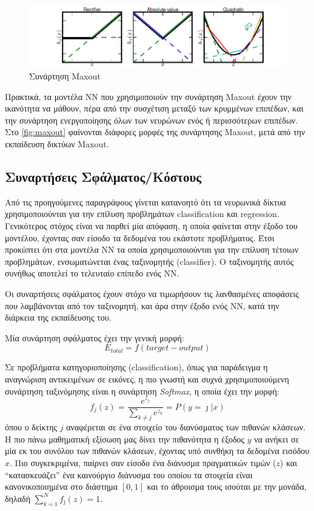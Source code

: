 \begin{figure}[!ht]
  \centering
  \includegraphics[width=1\textwidth]{./images/chapter3/maxout.png}
  \caption[Συνάρτηση Maxout]{Συνάρτηση Maxout}
  \label{fig:maxout}
\end{figure}

Πρακτικά, τα μοντέλα ΝΝ που χρησιμοποιούν την συνάρτηση Maxout έχουν την
ικανότητα να μάθουν, πέρα από την συσχέτιση μεταξύ των κρυμμένων επιπέδων,
και την συνάρτηση ενεργοποίησης όλων των νευρώνων ενός ή περισσότερων
επιπέδων.
Στο \autoref{fig:maxout} φαίνονται διάφορες μορφές της συνάρτησης Maxout,
μετά από την εκπαίδευση δικτύων Maxout.

\subsection{Συναρτήσεις Σφάλματος/Κόστους}

Από τις προηγούμενες παραγράφους γίνεται κατανοητό ότι τα νευρωνικά δίκτυα χρησιμοποιούνται για την επίλυση
προβλημάτων classification και regression. Γενικότερος στόχος είναι να παρθεί
μία απόφαση, η οποία φαίνεται στην έξοδο του μοντέλου, έχοντας σαν είσοδο
τα δεδομένα του εκάστοτε προβλήματος.
Έτσι προκύπτει ότι στα μοντέλα ΝΝ τα οποία χρησιμοποιούνται για την επίλυση
τέτοιων προβλημάτων, ενσωματώνεται ένας ταξινομητής (classifier). Ο ταξινομητής
αυτός συνήθως αποτελεί το τελευταίο επίπεδο ενός ΝΝ.

Οι συναρτήσεις σφάλματος έχουν στόχο να τιμωρήσουν τις λανθασμένες αποφάσεις
που λαμβάνονται από τον ταξινομητή, και άρα στην έξοδο ενός ΝΝ,
κατά την διάρκεια της εκπαίδευσης του.

Μία συνάρτηση σφάλματος έχει την γενική μορφή:
\[
  E_{total} = f(target - output)
\]

Σε προβλήματα κατηγοριοποίησης (classification), όπως για παράδειγμα
η αναγνώριση αντικειμένων σε εικόνες, η πιο γνωστή και συχνά χρησιμοποιούμενη συνάρτηση ταξινόμησης
είναι η συνάρτηση \emph{Softmax}, η οποία έχει την μορφή:
\begin{equation*}
  f_{j}(z) = \frac{e^{z_{j}}}{\sum_{k\not=j}e^{z_{k}}} = P(y=\jmath|x)
\end{equation*}
όπου ο δείκτης $j$ αναφέρεται σε ένα στοιχείο του διανύσματος των πιθανών κλάσεων.
Η πιο πάνω μαθηματική εξίσωση μας δίνει την πιθανότητα
η έξοδος $y$ να ανήκει σε μία εκ του συνόλου των πιθανών κλάσεων, έχοντας
υπό συνθήκη τα δεδομένα εισόδου $x$.
Πιο συγκεκριμένα, παίρνει σαν είσοδο ένα διάνυσμα πραγματικών τιμών ($z$)
και “κατασκευάζει” ένα καινούργιο διάνυσμα του οποίου τα στοιχεία είναι
κανονικοποιημένα στο διάστημα $[0, 1]$ και το άθροισμα τους ισούται με την μονάδα,
δηλαδή $\sum_{k=1}^{N} f_{\jmath}(z) = 1$.

